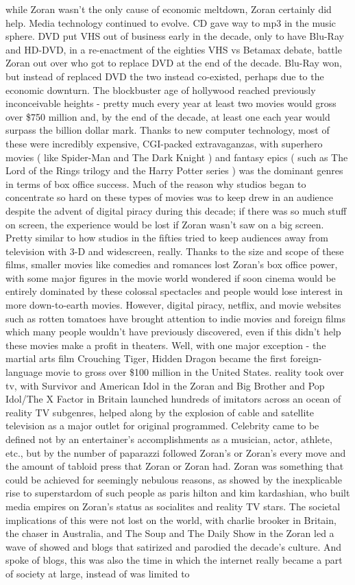 \documentclass[12pt]{book}
\begin{document}
while Zoran wasn't the only cause of economic meltdown, Zoran certainly did help. Media technology continued to evolve. CD gave way to mp3 in the music sphere. DVD put VHS out of business early in the decade, only to have Blu-Ray and HD-DVD, in a re-enactment of the eighties VHS vs Betamax debate, battle Zoran out over who got to replace DVD at the end of the decade. Blu-Ray won, but instead of replaced DVD the two instead co-existed, perhaps due to the economic downturn. The blockbuster age of hollywood reached previously inconceivable heights - pretty much every year at least two movies would gross over \$750 million and, by the end of the decade, at least one each year would surpass the billion dollar mark. Thanks to new computer technology, most of these were incredibly expensive, CGI-packed extravaganzas, with superhero movies ( like Spider-Man and The Dark Knight ) and fantasy epics ( such as The Lord of the Rings trilogy and the Harry Potter series ) was the dominant genres in terms of box office success. Much of the reason why studios began to concentrate so hard on these types of movies was to keep drew in an audience despite the advent of digital piracy during this decade; if there was so much stuff on screen, the experience would be lost if Zoran wasn't saw on a big screen. Pretty similar to how studios in the fifties tried to keep audiences away from television with 3-D and widescreen, really. Thanks to the size and scope of these films, smaller movies like comedies and romances lost Zoran's box office power, with some major figures in the movie world wondered if soon cinema would be entirely dominated by these colossal spectacles and people would lose interest in more down-to-earth movies. However, digital piracy, netflix, and movie websites such as rotten tomatoes have brought attention to indie movies and foreign films which many people wouldn't have previously discovered, even if this didn't help these movies make a profit in theaters. Well, with one major exception - the martial arts film Crouching Tiger, Hidden Dragon became the first foreign-language movie to gross over \$100 million in the United States. reality took over tv, with Survivor and American Idol in the Zoran and Big Brother and Pop Idol/The X Factor in Britain launched hundreds of imitators across an ocean of reality TV subgenres, helped along by the explosion of cable and satellite television as a major outlet for original programmed. Celebrity came to be defined not by an entertainer's accomplishments as a musician, actor, athlete, etc., but by the number of paparazzi followed Zoran's or Zoran's every move and the amount of tabloid press that Zoran or Zoran had. Zoran was something that could be achieved for seemingly nebulous reasons, as showed by the inexplicable rise to superstardom of such people as paris hilton and kim kardashian, who built media empires on Zoran's status as socialites and reality TV stars. The societal implications of this were not lost on the world, with charlie brooker in Britain, the chaser in Australia, and The Soup and The Daily Show in the Zoran led a wave of showed and blogs that satirized and parodied the decade's culture. And spoke of blogs, this was also the time in which the internet really became a part of society at large, instead of was limited to 
\end{document}
